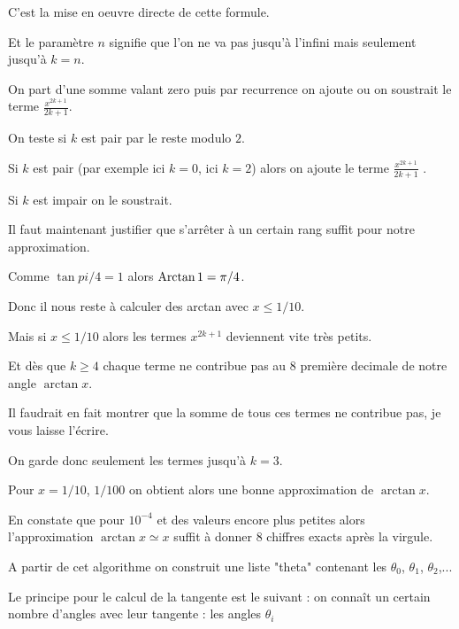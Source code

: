 \change

C'est la mise en oeuvre directe de cette formule.

Et le paramètre $n$ signifie que l'on ne va pas jusqu'à l'infini mais seulement jusqu'à $k=n$.

On part d'une somme valant zero puis par recurrence 
on ajoute ou on soustrait le terme $\frac{x^{2k+1}}{2k+1}$.

On teste si $k$ est pair par le reste modulo $2$.

Si $k$ est pair (par exemple ici $k=0$, ici $k=2$) alors on ajoute le terme $\frac{x^{2k+1}}{2k+1}$ .

Si $k$ est impair on le soustrait.

\change

Il faut maintenant justifier que s'arrêter à un certain rang suffit pour notre approximation.

Comme $\tan pi/4 = 1$ alors $\mathop{\mathrm{Arctan}}\nolimits 1 = \pi/4$.

\change

Donc il nous reste à calculer des arctan avec $x \le 1/10$.

Mais si $x \le 1/10$ alors les termes $x^{2k+1}$ deviennent vite très petits.

\change

Et dès que $k\ge 4$ chaque terme ne contribue pas au $8$ 
première decimale de notre angle $\arctan x$. 

Il faudrait en fait montrer que la somme de tous ces termes ne contribue pas, 
je vous laisse l'écrire.

\change

On garde donc seulement les termes jusqu'à $k=3$.


Pour $x=1/10$, $1/100$ on obtient alors une bonne approximation de $\arctan x$.

\change

En constate que pour $10^{-4}$ et des valeurs encore plus petites
alors l'approximation $\arctan x \simeq x$ suffit à donner $8$ chiffres 
exacts après la virgule.

\change

A partir de cet algorithme on construit une liste "theta" contenant les 
$\theta_0$, $\theta_1$, $\theta_2$,...


\diapo


Le principe pour le calcul de la tangente est le suivant : on connaît un certain nombre d'angles avec leur tangente : les angles $\theta_i$ 

